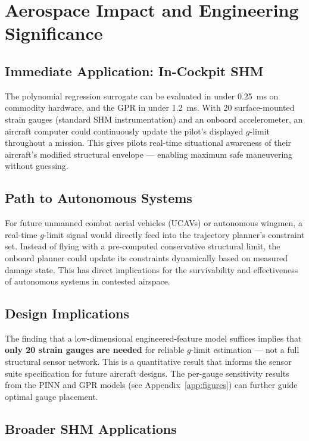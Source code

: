 \documentclass[10pt,letterpaper]{article}
\begin{document}
\section{Aerospace Impact and Engineering Significance}

\subsection{Immediate Application: In-Cockpit SHM}

The polynomial regression surrogate can be evaluated in under 0.25~ms on commodity
hardware, and the GPR in under 1.2~ms. With 20 surface-mounted strain gauges (standard SHM
instrumentation) and an onboard accelerometer, an aircraft computer could continuously update
the pilot's displayed $g$-limit throughout a mission. This gives pilots real-time situational
awareness of their aircraft's modified structural envelope --- enabling maximum safe
maneuvering without guessing.

\subsection{Path to Autonomous Systems}

For future unmanned combat aerial vehicles (UCAVs) or autonomous wingmen, a real-time
$g$-limit signal would directly feed into the trajectory planner's constraint set. Instead
of flying with a pre-computed conservative structural limit, the onboard planner could update
its constraints dynamically based on measured damage state. This has direct implications for
the survivability and effectiveness of autonomous systems in contested airspace.

\subsection{Design Implications}

The finding that a low-dimensional engineered-feature model suffices implies that
\textbf{only 20 strain gauges are needed} for reliable $g$-limit estimation --- not a full
structural sensor network. This is a quantitative result that informs the sensor suite
specification for future aircraft designs. The per-gauge sensitivity results from the PINN
and GPR models (see Appendix~\ref{app:figures}) can further guide optimal gauge placement.

\subsection{Broader SHM Applications}
\end{document}
